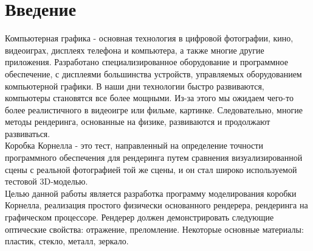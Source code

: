 \chapter*{Введение}


Компьютерная графика - основная технология в цифровой фотографии, кино, видеоиграх,
дисплеях телефона и компьютера,
а также многие другие приложения.
Разработано специализированное оборудование и программное обеспечение,
с дисплеями большинства устройств, управляемых оборудованием компьютерной графики.
В наши дни технологии быстро развиваются, компьютеры становятся все более мощными.
Из-за этого мы ожидаем чего-то более реалистичного в видеоигре или фильме, картинке.
Следовательно, многие методы рендеринга, основанные на физике, развиваются и продолжают развиваться.
\\

Коробка Корнелла - это тест, направленный на определение точности программного обеспечения для рендеринга путем сравнения визуализированной сцены с реальной фотографией той же сцены, и он стал широко используемой тестовой 3D-моделью.
\\

Целью данной работы является
разработка программу моделирования коробки Корнелла, реализация простого физически основанного рендерера,
рендеринга на графическом процессоре.
Рендерер должен демонстрировать следующие оптические свойства:
отражение, преломление.
Некоторые основные материалы: пластик, стекло, металл, зеркало.
\\




